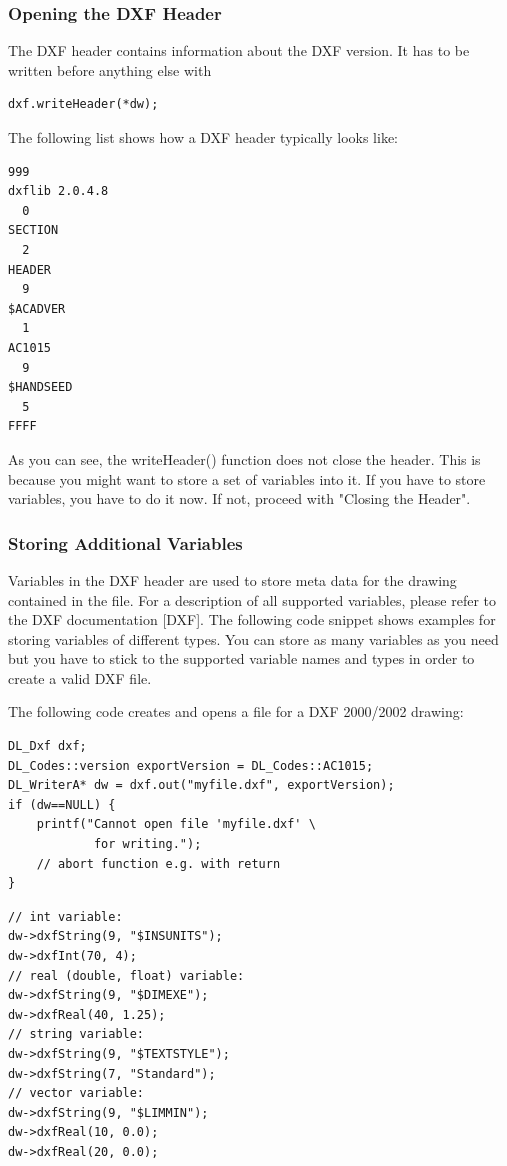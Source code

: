 \subsubsection*{Opening the DXF Header}
The DXF header contains information about the DXF version. It has to be written before anything else with
\begin{verbatim}
dxf.writeHeader(*dw);
\end{verbatim}
The following list shows how a DXF header typically looks like:
\begin{verbatim}
999
dxflib 2.0.4.8
  0
SECTION
  2
HEADER
  9
$ACADVER
  1
AC1015
  9
$HANDSEED
  5
FFFF
\end{verbatim}

As you can see, the writeHeader() function does not close the header. This is because you might want to store a set of variables into it. If you have to store variables, you have to do it now. If not, proceed with "Closing the Header".

\subsubsection*{Storing Additional Variables}
Variables in the DXF header are used to store meta data for the drawing contained in the file. For a description of all supported variables, please refer to the DXF documentation [DXF].
The following code snippet shows examples for storing variables of different types. You can store as many variables as you need but you have to stick to the supported variable names and types in order to create a valid DXF file.


The following code creates and opens a file for a DXF 2000/2002 drawing:
\begin{verbatim}
DL_Dxf dxf;
DL_Codes::version exportVersion = DL_Codes::AC1015;
DL_WriterA* dw = dxf.out("myfile.dxf", exportVersion);
if (dw==NULL) {
    printf("Cannot open file 'myfile.dxf' \
            for writing.");
    // abort function e.g. with return
}
\end{verbatim}


\begin{verbatim}
// int variable:
dw->dxfString(9, "$INSUNITS");
dw->dxfInt(70, 4);
// real (double, float) variable:
dw->dxfString(9, "$DIMEXE");
dw->dxfReal(40, 1.25);
// string variable:
dw->dxfString(9, "$TEXTSTYLE");
dw->dxfString(7, "Standard");
// vector variable:
dw->dxfString(9, "$LIMMIN");
dw->dxfReal(10, 0.0);
dw->dxfReal(20, 0.0);
\end{verbatim}

